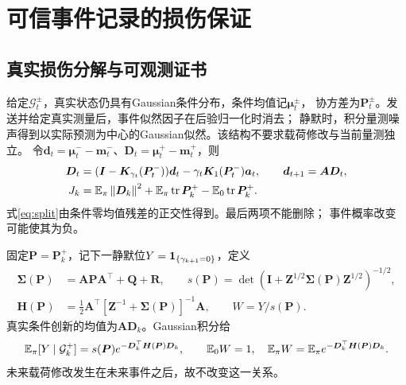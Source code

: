 \section{可信事件记录的损伤保证}
\subsection{真实损伤分解与可观测证书}
给定$\mathcal G_t^\pm$，真实状态仍具有Gaussian条件分布，条件均值记${\bm{\mu}}_t^\pm$，
协方差为${\bm{P}}_t^\pm$。发送并给定真实测量后，事件似然因子在后验归一化时消去；
静默时，积分量测噪声得到以实际预测为中心的Gaussian似然。该结构不要求载荷修改与当前量测独立。
令${\bm{d}}_t={\bm{\mu}}_t^--{\bm{m}}_t^-$、${\bm{D}}_t={\bm{\mu}}_t^+-{\bm{m}}_t^+$，则
\begin{align}
{\bm{D}}_t&=({\bm{I}}-{\bm{K}}_{\gamma_t}({\bm{P}}_t^-)){\bm{d}}_t-\gamma_t{\bm{K}}_1({\bm{P}}_t^-){\bm{a}}_t,\qquad
{\bm{d}}_{t+1}={\bm{A}}{\bm{D}}_t,\label{eq:bias}\\
J_k&=\mathbb E_\pi\left\|{\bm{D}}_k\right\|^2+
\mathbb E_\pi\operatorname{tr} {\bm{P}}_k^+-\mathbb E_0\operatorname{tr} {\bm{P}}_k^+.\label{eq:split}
\end{align}
式\eqref{eq:split}由条件零均值残差的正交性得到。最后两项不能删除；
事件概率改变可能使其为负。

固定${\bm{P}}={\bm{P}}_k^+$，记下一静默位$Y=\mathbf 1_{\{\gamma_{k+1}=0\}}$，定义
\begin{align}
{\bm{\Sigma}}({\bm{P}})&={\bm{A}}{\bm{P}}{\bm{A}}^\top+{\bm{Q}}+{\bm{R}},\qquad
s({\bm{P}})=\det({\bm{I}}+{\bm{Z}}^{1/2}{\bm{\Sigma}}({\bm{P}}){\bm{Z}}^{1/2})^{-1/2},\nonumber\\
{\bm{H}}({\bm{P}})&=\tfrac12 {\bm{A}}^\top[{\bm{Z}}^{-1}+{\bm{\Sigma}}({\bm{P}})]^{-1}{\bm{A}},\qquad
W=Y/s({\bm{P}}).
\end{align}
真实条件创新的均值为${\bm{A}}{\bm{D}}_k$。Gaussian积分给
\begin{equation}
\mathbb E_\pi[Y\mid\mathcal G_k^+]=s({\bm{P}})e^{-{\bm{D}}_k^\top {\bm{H}}({\bm{P}}){\bm{D}}_k},
\qquad \mathbb E_0W=1,\quad \mathbb E_\pi W=\mathbb E_\pi e^{-{\bm{D}}_k^\top {\bm{H}}({\bm{P}}){\bm{D}}_k}.
\label{eq:witness}
\end{equation}
未来载荷修改发生在未来事件之后，故不改变这一关系。

